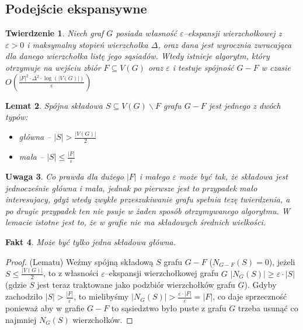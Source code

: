 \documentclass{pracamgr}
\newtheorem{theorem}{Twierdzenie}
\newtheorem{lemma}[theorem]{Lemat}
\newtheorem{remark}[theorem]{Uwaga}
\newtheorem{fact}[theorem]{Fakt}
\begin{document}
   \subsection{Podejście ekspansywne}
    \begin{theorem}\label{Spójność ekspansywna}
     Niech graf $G$ posiada własność $\varepsilon$--ekspansji wierzchołkowej z $\varepsilon>0$ i maksymalny stopień wierzchołka $\Delta$,
     oraz dana jest wyrocznia zwracająca dla danego wierzchołka listę jego sąsiadów.
     Wtedy istnieje algorytm, który otrzymuje na wejściu zbiór $F\subseteq V(G)$ oraz $\varepsilon$
     i testuje spójność $G-F$ w czasie $O\left(\frac{|F|^2\cdot\Delta^2\cdot\log(|V(G)|)}{\varepsilon}\right)$
    \end{theorem}
    \begin{lemma}\label{klasyfikacja skladowych}
     Spójna składowa $S\subseteq V(G)\backslash F$ grafu $G-F$ jest jednego z dwóch typów:
     \begin{itemize}
      \item główna -- $|S|>\frac{|V(G)|}{2}$
      \item mała -- $|S|\le\frac{|F|}{\varepsilon}$
     \end{itemize}
    \end{lemma}
    \begin{remark}\label{klasyfikacja skladowych 2}
     Co prawda dla dużego $|F|$ i małego $\varepsilon$ może być tak, że składowa jest jednocześnie główna i mała, jednak po pierwsze jest to przypadek mało
     interesujacy, gdyż wtedy zwykłe przeszukiwanie grafu spełnia tezę twierdzenia, a po drugie przypadek ten nie psuje w żaden sposób otrzymywanego algorytmu.
     W lemacie istotne jest to, że w grafie nie ma składowych średnich wielkości.
    \end{remark}
    \begin{fact}\label{jedna glowna skladowa}
     Może być tylko jedna składowa główna.
    \end{fact}
    \begin{proof}
     (Lematu)\newline
     Weźmy spójną składową $S$ grafu $G-F$ ($N_{G-F}(S)=0$), jeżeli $S\le\frac{|V(G)|}{2}$, to z własności $\varepsilon$--ekspansji wierzchołkowej grafu $G$
     $|N_G(S)|\ge\varepsilon\cdot|S|$ (gdzie $S$ jest teraz traktowane jako podzbiór wierzchołków grafu $G$). Gdyby zachodziło $|S|>\frac{|F|}{\varepsilon}$,
     to mielibyśmy $|N_G(S)|>\frac{\varepsilon\cdot|F|}{\varepsilon}=|F|$, co daje sprzeczność ponieważ aby w grafie $G-F$ to sąsiedztwo było puste z grafu
     $G$ trzeba usunąć co najmniej $N_G(S)$ wierzchołków.
    \end{proof}
\end{document}
